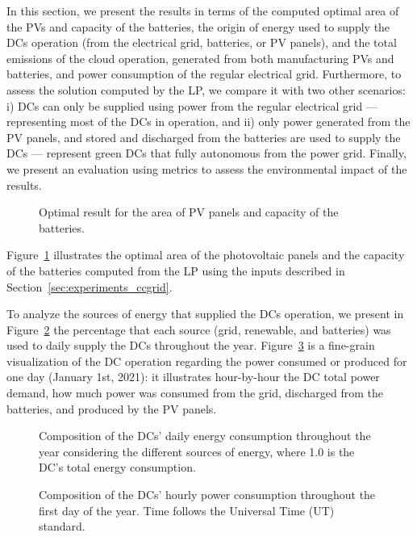 In this section, we present the results in terms of the computed optimal area of the PVs and capacity of the batteries, the origin of energy used to supply the DCs operation (from the electrical grid, batteries, or PV panels), and the total emissions of the cloud operation, generated from both manufacturing PVs and batteries, and power consumption of the regular electrical grid. Furthermore, to assess the solution computed by the LP, we compare it with two other scenarios: i) DCs can only be supplied using power from the regular electrical grid --- representing most of the DCs in operation, and ii) only power generated from the PV panels, and stored and discharged from the batteries are used to supply the DCs --- represent green DCs that fully autonomous from the power grid. Finally, we present an evaluation using metrics to assess the environmental impact of the results.


\begin{figure}[!htbp]
  \centering
  {}
  \caption{Optimal result for the area of PV panels and capacity of the batteries.}
  \label{fig:sizing}
\end{figure}

Figure~\ref{fig:sizing} illustrates the optimal area of the photovoltaic panels and the capacity of the batteries computed from the LP using the inputs described in Section~\ref{sec:experiments_ccgrid}.

To analyze the sources of energy that supplied the DCs operation, we present in Figure~\ref{fig:energy_ratio_daily} the percentage that each source (grid, renewable, and batteries) was used to daily supply the DCs throughout the year. Figure~\ref{fig:power_ratio_hourly} is a fine-grain visualization of the DC operation regarding the power consumed or produced for one day (January 1st, 2021): it illustrates hour-by-hour the DC total power demand, how much power was consumed from the grid, discharged from the batteries, and produced by the PV panels.
 

\begin{figure}[!htbp]
  \centering
   {}
  \caption{Composition of the DCs' daily energy consumption throughout the year considering the different sources of energy, where 1.0 is the DC's total energy consumption.}
  \label{fig:energy_ratio_daily}
\end{figure}




 \begin{figure}[!htbp]
  \centering
   {}
  \caption{Composition of the DCs' hourly power consumption throughout the first day of the year. Time follows the Universal Time (UT) standard.}
  \label{fig:power_ratio_hourly}
\end{figure}

